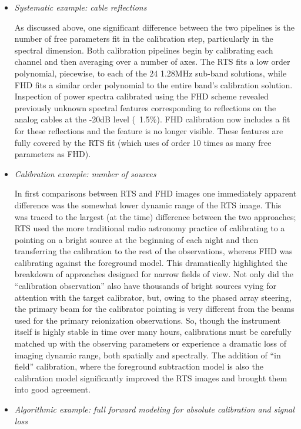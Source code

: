 \documentclass[twolcolumn,iop]{emulateapj}
\begin{document}
\begin{itemize}

\item \emph{ Systematic example: cable reflections}

As discussed above, one significant difference between the two pipelines is the number of free parameters fit in the calibration step, particularly in the spectral dimension.  Both calibration pipelines begin by calibrating each channel and then averaging over a number of axes.  The RTS fits a low order polynomial, piecewise, to each of the 24 1.28MHz sub-band solutions, while FHD fits a similar order polynomial to the entire  band's calibration solution.  Inspection of power spectra calibrated using the FHD scheme revealed previously unknown spectral features corresponding to reflections on the analog cables at the -20dB level (~1.5\%). FHD calibration now includes a fit for these reflections and the feature is no longer visible. These features are fully covered by the RTS fit (which uses of order 10 times as many free parameters as FHD). 

\item \emph{Calibration example: number of sources}

In first comparisons between RTS and FHD images one immediately apparent difference was the somewhat lower dynamic range of the RTS image.  This was traced to the largest (at the time) difference between the two approaches; RTS used the more traditional radio astronomy practice of calibrating to a pointing on a bright source at the beginning of each night and then transferring the calibration to the rest of the observations, whereas FHD was calibrating against the foreground model. This dramatically highlighted the breakdown of approaches designed for narrow fields of view. Not only did the ``calibration observation'' also have thousands of bright sources vying for attention with the target calibrator, but, owing to the phased array steering, the primary beam for the calibrator pointing is very different from the beams used for the primary reionization observations. So, though the instrument itself is highly stable in time over many hours, calibrations must be carefully matched up with the observing parameters or experience a dramatic loss of imaging dynamic range, both spatially and spectrally. The addition of ``in field'' calibration, where the foreground subtraction model is also the calibration model significantly improved the RTS images and brought them into good agreement.


\item \emph{Algorithmic example: full forward modeling for absolute calibration and signal loss}


\end{itemize}
\end{document}
